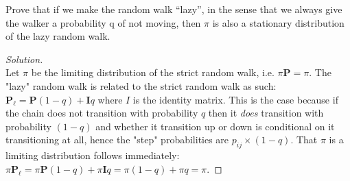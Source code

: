 \documentclass[12pt]{article}
\newenvironment{problem}[2][Problem]{\begin{trivlist}
\item[\hskip \labelsep {\bfseries #1}\hskip \labelsep {\bfseries #2.}]}{\end{trivlist}}
\newenvironment{solution}
  {\begin{proof}[Solution]\renewcommand{\qedsymbol}{}}
  {\end{proof}}
\begin{document}
\begin{problem}{5} %
Prove that if we make the random walk “lazy”, in the sense that we always give the walker a probability q of not moving, then $\pi$ is also a stationary distribution of the lazy random walk.
\end{problem}
\begin{solution}\ \\

Let $\pi$ be the limiting distribution of the strict random walk, i.e. $\pi\mathbf{P}=\pi$. The "lazy" random walk is related to the strict random walk as such: $\mathbf{P_\ell} = \mathbf{P}(1-q) + \mathbf{I}q$ where $I$ is the identity matrix. This is the case because if the chain does not transition with probability $q$ then it \textit{does} transition with probability $(1-q)$ and whether it transition up or down is conditional on it transitioning at all, hence the "step" probabilities are $p_{ij}\times(1-q)$. That $\pi$ is a limiting distribution follows immediately: $\pi \mathbf{P_\ell} = \pi \mathbf{P} (1-q) + \pi \mathbf{I} q = \pi(1-q) + \pi q = \pi$.

\end{solution}
 
\end{document}
